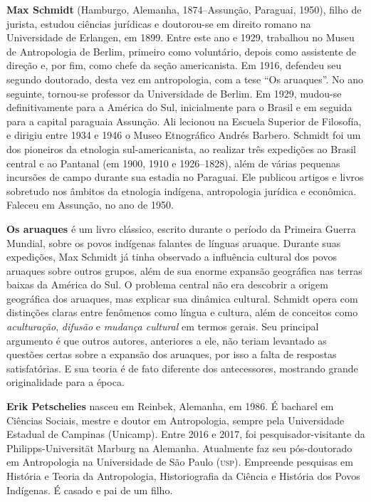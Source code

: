 \textbf{Max Schmidt} (Hamburgo, Alemanha, 1874--Assunção, Paraguai, 1950), filho de jurista, estudou ciências jurídicas e doutorou-se em direito romano na Universidade de Erlangen, em 1899. Entre este ano e 1929, trabalhou no Museu de Antropologia de Berlim, primeiro como voluntário, depois como assistente de direção e, por fim, como chefe da seção americanista. Em 1916, defendeu seu segundo doutorado, desta vez em antropologia, com a tese ``Os aruaques''. No ano seguinte, tornou-se professor da Universidade de Berlim. Em 1929, mudou-se definitivamente para a América do Sul, inicialmente para o Brasil e em seguida para a capital paraguaia Assunção. Ali lecionou na Escuela Superior de Filosofía, e dirigiu entre 1934 e 1946 o Museo Etnográfico Andrés Barbero. Schmidt foi um dos pioneiros da etnologia sul-americanista, ao realizar três expedições ao Brasil central e ao Pantanal (em 1900, 1910 e 1926--1828), além de várias pequenas incursões de campo durante sua estadia no Paraguai. Ele publicou artigos e livros sobretudo nos âmbitos da etnologia indígena, antropologia jurídica e econômica. Faleceu em Assunção, no ano de 1950.

\textbf{Os aruaques} é um livro clássico, escrito durante o período da Primeira Guerra Mundial, sobre os povos indígenas falantes de línguas aruaque. Durante suas expedições, Max Schmidt já tinha observado a influência cultural dos povos aruaques sobre outros grupos, além de sua enorme expansão geográfica nas terras baixas da América do Sul. O problema central não era descobrir a origem geográfica dos aruaques, mas explicar sua dinâmica cultural. Schmidt opera com distinções claras entre fenômenos como língua e cultura, além de conceitos como \textit{aculturação}, \textit{difusão} e \textit{mudança cultural} em termos gerais. Seu principal argumento é que outros autores, anteriores a ele, não teriam levantado as questões certas sobre a expansão dos aruaques, por isso a falta de respostas satisfatórias. E sua teoria é de fato diferente dos antecessores, mostrando grande originalidade para a época.

\pagebreak
\thispagestyle{empty}

\textbf{Erik Petschelies} nasceu em Reinbek, Alemanha, em 1986. É bacharel em Ciências Sociais, mestre e doutor em Antropologia, sempre pela Universidade Estadual de Campinas (Unicamp). Entre 2016 e 2017, foi pesquisador-visitante da Philipps-Universität Marburg na Alemanha. Atualmente faz seu pós-doutorado em Antropologia na Universidade de São Paulo (\textsc{usp}). Empreende pesquisas em História e Teoria da Antropologia, Historiografia da Ciência e História dos Povos Indígenas. É casado e pai de um filho.

